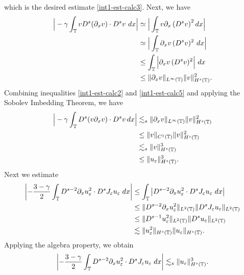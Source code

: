%
which  is the desired estimate  \eqref{int1-est-calc3}.
Next, we have
%
%
%
\begin{equation} 
\label{int1-est-calc5}
\begin{split}
\Big|
-\gamma \int_{\mathbb{T}}
v D^s (\partial_x v)
\cdot  D^s v \ dx
\Big|
& \simeq 
 \Big|
\int_{\mathbb{T}}
v \partial_x\left(D^s v\right)^2  dx
\Big|
\\
& \simeq
\Big | \int_{\mathbb{T}}
\partial_x v \, (D^s v)^2 \ dx
\Big|
\\
& \le
\int_{\mathbb{T}}
\Big | \partial_x v \, (D^s v)^2   
\Big| \ dx
\\
& \le
\| \partial_x v \|_{L^\infty(\mathbb{T})} 
\| v \|_{H^s(\mathbb{T})}^2.
\end{split}
\end{equation}
%
%
%
Combining inequalities  \eqref{int1-est-calc2} and
\eqref{int1-est-calc5} and applying the Sobolev Imbedding Theorem, we
have
%
\begin{equation} 
\label{burgers_est'}
\begin{split}
\Big|
-\gamma \int_{\mathbb{T}}
D^s(v \partial_x v) \cdot   D^s v \, dx  
\Big|
&\lesssim_{s}
\| \partial_x v \|_{L^\infty(\mathbb{T})} 
\|  v \|_{H^s(\mathbb{T})}^2
\\
& \le  \| v \|_{C^1(\mathbb{T})} \| v \|_{H^s(\mathbb{T})}^2
\\
& \lesssim_{s}  \| v \|_{H^s(\mathbb{T})}^3
\\
& \le  \| u_\varepsilon \|_{H^s(\mathbb{T})}^3.
\end{split}
\end{equation}
%
Next we estimate
\begin{equation}
\begin{split}
\left | - \frac{3 -\gamma}{2} \int_{\mathbb{T}} D^{s-2} \partial_x u_\varepsilon^2 \cdot
D^s J_\varepsilon u_\varepsilon \; dx \right |
& \le  \int_{\mathbb{T}} \left |
D^{s-2} \partial_x u_\varepsilon^2 \cdot D^s J_\varepsilon u_\varepsilon \; dx \right | 
\\
& \le 
\|D^{s-2} \partial_x u_\varepsilon^2 \|_{L^2(\mathbb{T})} 
\|D^s J_\varepsilon u_\varepsilon \|_{L^2(\mathbb{T})}
\\
& \le 
\|D^{s-1} u_\varepsilon^2 \|_{L^2(\mathbb{T})} 
\|D^s u_\varepsilon \|_{L^2(\mathbb{T})}
\\
& \lesssim \| u_\varepsilon^2 \|_{H^s(\mathbb{T})} \| u_\varepsilon \|_{H^s(\mathbb{T})}.
\end{split}
\end{equation}
%
%
Applying the algebra property, we obtain
%
\begin{equation}
\label{hl1}
\begin{split}
\left | - \frac{3 -\gamma}{2} \int_{\mathbb{T}} D^{s-2} \partial_x u_\varepsilon^2 \cdot
D^s J_\varepsilon u_\varepsilon \; dx \right |
\lesssim_{s} \| u_\varepsilon \|_{H^s(\mathbb{T})}^3.
\end{split}
\end{equation}

